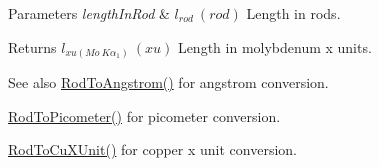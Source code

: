\begin{DoxyParams}{Parameters}
{\em length\+In\+Rod} & $ l_{rod}\ (rod)$ Length in rods. \\
\hline
\end{DoxyParams}
\begin{DoxyReturn}{Returns}
$ l_{xu(Mo\ K\alpha_1)}\ (xu)$ Length in molybdenum x units. 
\end{DoxyReturn}
\begin{DoxySeeAlso}{See also}
\mbox{\hyperlink{group___e_g_x_math-_conversions-_length_conversions-_imperial-_rod-_non-_s_i_ga079b9122c8747685d7057ec05fefdb7f}{Rod\+To\+Angstrom()}} for angstrom conversion. 

\mbox{\hyperlink{group___e_g_x_math-_conversions-_length_conversions-_imperial-_rod-_s_i_ga212e66c6922a0df85714ec8559af8790}{Rod\+To\+Picometer()}} for picometer conversion. 

\mbox{\hyperlink{group___e_g_x_math-_conversions-_length_conversions-_imperial-_rod-_non-_s_i_gac344dc1fbafaa0451704947bf33a8594}{Rod\+To\+Cu\+X\+Unit()}} for copper x unit conversion. 
\end{DoxySeeAlso}
